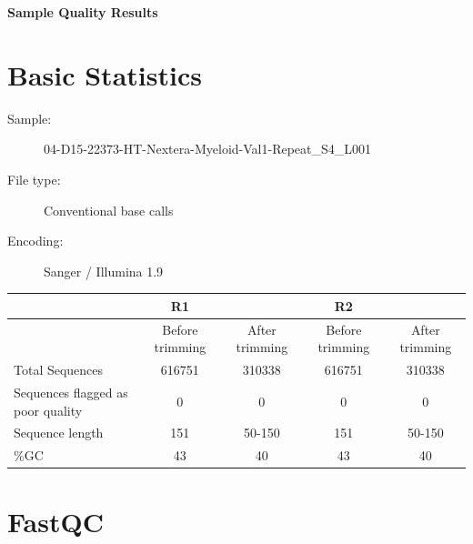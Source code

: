 \documentclass{article}
\begin{document}
\makeatletter
\setlength{\@fptop}{0pt}
\makeatother
\renewcommand{\baselinestretch}{1.0}
\begin{center}
\Large{\textbf{Sample Quality Results}}
\end{center}
\section{Basic Statistics}
\begin{description}
\item[Sample:]
04{-}D15{-}22373{-}HT{-}Nextera{-}Myeloid{-}Val1{-}Repeat\_S4\_L001
\item[File type:]
Conventional base calls
\item[Encoding:]
Sanger / Illumina 1.9
\end{description}
\begin{tabular}{p{5.5cm}|c|c|c|c}
&R1&&R2&\\
\hline
&Before trimming&After trimming&Before trimming&After trimming\\
\hline
Total Sequences&616751&310338&616751&310338\\
Sequences flagged as poor quality&0&0&0&0\\
Sequence length&151&50{-}150&151&50{-}150\\
\%GC&43&40&43&40\\
\end{tabular}


\section{FastQC}
\end{document}
